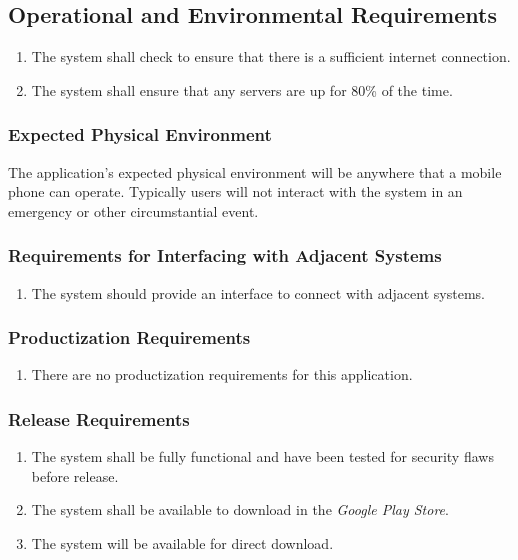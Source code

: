 \documentclass[titlepage]{article}
\begin{document}
		
		\subsection{Operational and Environmental Requirements}
		\label{sub:operational_and_environmental_requirements}
		\begin{enumerate}
			\item
			The system shall check to ensure that there is a sufficient internet connection.
			\item
			The system shall ensure that any servers are up for 80\% of the time.
		\end{enumerate}
		
		\subsubsection{Expected Physical Environment}
		\label{ssub:expected_physical_environment}
		The application's expected physical environment will be anywhere that a mobile phone can operate. Typically users will not interact with the system in an emergency or other circumstantial event.
		
		\subsubsection{Requirements for Interfacing with Adjacent Systems}
		\label{ssub:requirements_for_interfacing_with_adjacent_systems}
		\begin{enumerate}[{OE}1. ]
			\item 
			The system should provide an interface to connect with adjacent systems.
		\end{enumerate}
		
		\subsubsection{Productization Requirements}
		\label{ssub:productization_requirements}
		\begin{enumerate}[{OE}1. ]
			\item There are no productization requirements for this application.
		\end{enumerate}
		
		\subsubsection{Release Requirements}
		\label{ssub:release_requirements}
		\begin{enumerate}[{OE}1. ]
			\item The system shall be fully functional and have been tested for security flaws before release.
			\item The system shall be available to download in the \textit{Google Play Store}.
			\item The system will be available for direct download.
		\end{enumerate}
		
\end{document}
